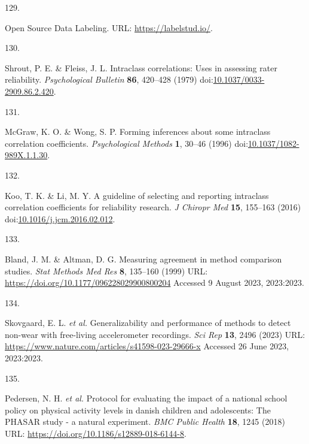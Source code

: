 \documentclass[
  10pt,
]{scrbook}
\newlength{\cslhangindent}
\newlength{\csllabelwidth}
\newlength{\cslentryspacingunit} %
\newenvironment{CSLReferences}[2] %
 {%
  \setlength{\parindent}{0pt}
  \ifodd #1
  \let\oldpar\par
  \def\par{\hangindent=\cslhangindent\oldpar}
  \fi
  \setlength{\parskip}{#2\cslentryspacingunit}
 }%
 {}
\newcommand{\CSLLeftMargin}[1]{\parbox[t]{\csllabelwidth}{#1}}
\newcommand{\CSLRightInline}[1]{\parbox[t]{\linewidth - \csllabelwidth}{#1}\break}
\let\originaltextbf\textbf
\renewcommand{\textbf}[1]{\textcolor{color1}{\originaltextbf{#1}}}
\begin{document}
\begin{CSLReferences}{0}{0}
\leavevmode{}%
\CSLLeftMargin{129. }%
\CSLRightInline{Open Source Data Labeling. URL:
\url{https://labelstud.io/}.}

\leavevmode{}%
\CSLLeftMargin{130. }%
\CSLRightInline{Shrout, P. E. \& Fleiss, J. L. Intraclass correlations:
Uses in assessing rater reliability. \emph{Psychological Bulletin}
\textbf{86}, 420--428 (1979)
doi:\href{https://doi.org/10.1037/0033-2909.86.2.420}{10.1037/0033-2909.86.2.420}.}

\leavevmode{}%
\CSLLeftMargin{131. }%
\CSLRightInline{McGraw, K. O. \& Wong, S. P. Forming inferences about
some intraclass correlation coefficients. \emph{Psychological Methods}
\textbf{1}, 30--46 (1996)
doi:\href{https://doi.org/10.1037/1082-989X.1.1.30}{10.1037/1082-989X.1.1.30}.}

\leavevmode{}%
\CSLLeftMargin{132. }%
\CSLRightInline{Koo, T. K. \& Li, M. Y. A guideline of selecting and
reporting intraclass correlation coefficients for reliability research.
\emph{J Chiropr Med} \textbf{15}, 155--163 (2016)
doi:\href{https://doi.org/10.1016/j.jcm.2016.02.012}{10.1016/j.jcm.2016.02.012}.}

\leavevmode{}%
\CSLLeftMargin{133. }%
\CSLRightInline{Bland, J. M. \& Altman, D. G. Measuring agreement in
method comparison studies. \emph{Stat Methods Med Res} \textbf{8},
135--160 (1999) URL: \url{https://doi.org/10.1177/096228029900800204}
Accessed 9 August 2023, 2023:2023.}

\leavevmode{}%
\CSLLeftMargin{134. }%
\CSLRightInline{Skovgaard, E. L. \emph{et al.} Generalizability and
performance of methods to detect non-wear with free-living accelerometer
recordings. \emph{Sci Rep} \textbf{13}, 2496 (2023) URL:
\url{https://www.nature.com/articles/s41598-023-29666-x} Accessed 26
June 2023, 2023:2023.}

\leavevmode{}%
\CSLLeftMargin{135. }%
\CSLRightInline{Pedersen, N. H. \emph{et al.} Protocol for evaluating
the impact of a national school policy on physical activity levels in
danish children and adolescents: The PHASAR study - a natural
experiment. \emph{BMC Public Health} \textbf{18}, 1245 (2018) URL:
\url{https://doi.org/10.1186/s12889-018-6144-8}.}


\end{CSLReferences}
\end{document}
